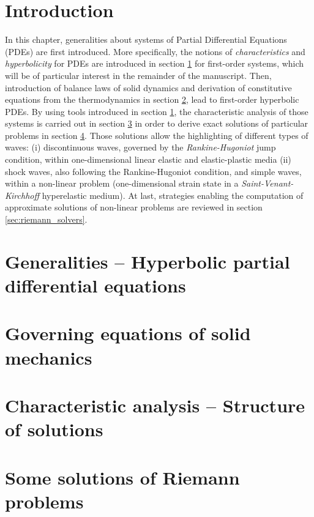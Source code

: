 \section*{Introduction}
In this chapter, generalities about systems of Partial Differential Equations (PDEs) are first introduced. More specifically, the notions of \textit{characteristics} and \textit{hyperbolicity} for PDEs are introduced in section \ref{sec:PDEs} for first-order systems, which will be of particular interest in the remainder of the manuscript.
Then, introduction of balance laws of solid dynamics and derivation of constitutive equations from the thermodynamics in section \ref{sec:solidMech_equations}, lead to first-order hyperbolic PDEs.
By using tools introduced in section \ref{sec:PDEs}, the characteristic analysis of those systems is carried out in section \ref{sec:characteristic_analysis} in order to derive exact solutions of particular problems in section \ref{sec:riemann_problems}. Those solutions allow the highlighting of different types of waves: (i) discontinuous waves, governed by the \textit{Rankine-Hugoniot} jump condition, within one-dimensional linear elastic and elastic-plastic media (ii) shock waves, also following the Rankine-Hugoniot condition, and simple waves, within a non-linear problem (one-dimensional strain state in a \textit{Saint-Venant-Kirchhoff} hyperelastic medium).
At last, strategies enabling the computation of approximate solutions of non-linear problems are reviewed in section \ref{sec:riemann_solvers}.


\section{Generalities -- Hyperbolic partial differential equations}
\label{sec:PDEs}


\section{Governing equations of solid mechanics}
\label{sec:solidMech_equations}



\section{Characteristic analysis -- Structure of solutions}
\label{sec:characteristic_analysis}


\section{Some solutions of Riemann problems}
\label{sec:riemann_problems}

